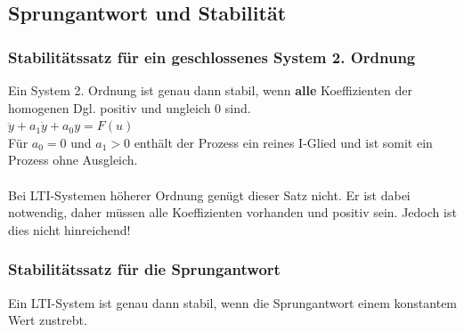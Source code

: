 			
	\subsection{Sprungantwort und Stabilität }
		\subsubsection{Stabilitätssatz für ein geschlossenes System 2. Ordnung }
			Ein System 2. Ordnung ist genau dann stabil, wenn {\bf alle} Koeffizienten der
			homogenen Dgl. positiv und ungleich 0 sind.\\
			$\ddot{y}+a_1\dot{y}+a_0y=F(u)$ \\
			Für $a_0 = 0$ und $a_1 > 0$ enthält der Prozess ein reines I-Glied und
			ist somit ein Prozess ohne Ausgleich.  \\ \\
			Bei LTI-Systemen höherer Ordnung genügt dieser Satz nicht. Er ist dabei notwendig, daher müssen alle Koeffizienten vorhanden und positiv sein. Jedoch ist dies nicht hinreichend!
			
		\subsubsection{Stabilitätssatz für die Sprungantwort}
			Ein LTI-System ist genau dann stabil, wenn die Sprungantwort einem
			konstantem Wert zustrebt.
